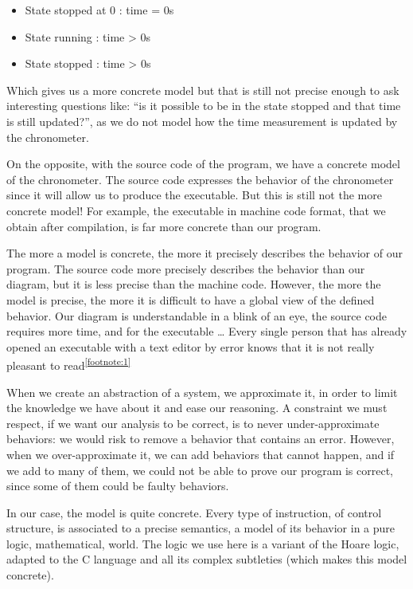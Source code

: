 \documentclass[middle]{zmdocument}
\begin{document}
\begin{itemize}
\item State stopped at 0 : time = 0s
\item State running : time > 0s
\item State stopped : time > 0s
\end{itemize}



Which gives us a more concrete model but that is still not precise
enough to ask interesting questions like: ``is it possible to be in the
state stopped and that time is still updated?'', as we do not model how
the time measurement is updated by the chronometer.



On the opposite, with the source code of the program, we have a concrete
model of the chronometer. The source code expresses the behavior of the
chronometer since it will allow us to produce the executable. But this
is still not the more concrete model! For example, the executable in
machine code format, that we obtain after compilation, is far more
concrete than our program.



The more a model is concrete, the more it precisely describes the
behavior of our program. The source code more precisely describes the
behavior than our diagram, but it is less precise than the machine code.
However, the more the model is precise, the more it is difficult to have
a global view of the defined behavior. Our diagram is understandable in
a blink of an eye, the source code requires more time, and for the
executable \ldots{} Every single person that has already opened an
executable with a text editor by error knows that it is not really
pleasant to read\textsuperscript{\ref{footnote:1}}



When we create an abstraction of a system, we approximate it, in order
to limit the knowledge we have about it and ease our reasoning. A
constraint we must respect, if we want our analysis to be correct, is to
never under-approximate behaviors: we would risk to remove a behavior
that contains an error. However, when we over-approximate it, we can add
behaviors that cannot happen, and if we add to many of them, we could
not be able to prove our program is correct, since some of them could be
faulty behaviors.



In our case, the model is quite concrete. Every type of instruction, of
control structure, is associated to a precise semantics, a model of its
behavior in a pure logic, mathematical, world. The logic we use here is
a variant of the Hoare logic, adapted to the C language and all its
complex subtleties (which makes this model concrete).
\end{document}
